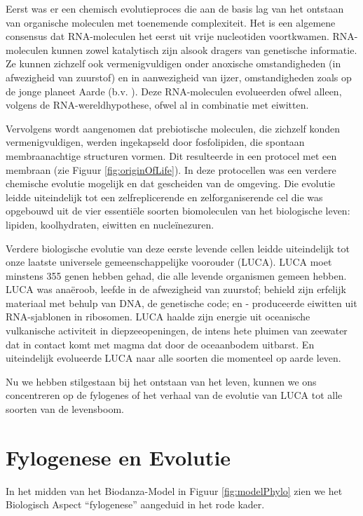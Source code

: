 \documentclass[
  11pt,
]{book}
\begin{document}
Eerst was er een chemisch evolutieproces die aan de basis lag van het ontstaan van organische moleculen met toenemende complexiteit. Het is een algemene consensus dat RNA-moleculen het eerst uit vrije nucleotiden voortkwamen. RNA-moleculen kunnen zowel katalytisch zijn alsook dragers van genetische informatie. Ze kunnen zichzelf ook vermenigvuldigen onder anoxische omstandigheden (in afwezigheid van zuurstof) en in aanwezigheid van ijzer, omstandigheden zoals op de jonge planeet Aarde (b.v. \citet{Williams2013}). Deze RNA-moleculen evolueerden ofwel alleen, volgens de RNA-wereldhypothese, ofwel al in combinatie met eiwitten.

Vervolgens wordt aangenomen dat prebiotische moleculen, die zichzelf konden vermenigvuldigen, werden ingekapseld door fosfolipiden, die spontaan membraanachtige structuren vormen. Dit resulteerde in een protocel met een membraan (zie Figuur \ref{fig:originOfLife}).
In deze protocellen was een verdere chemische evolutie mogelijk en dat gescheiden van de omgeving. Die evolutie leidde uiteindelijk tot een zelfreplicerende en zelforganiserende cel die was opgebouwd uit de vier essentiële soorten biomoleculen van het biologische leven: lipiden, koolhydraten, eiwitten en nucleïnezuren.

Verdere biologische evolutie van deze eerste levende cellen leidde uiteindelijk tot onze laatste universele gemeenschappelijke voorouder (LUCA). LUCA moet minstens 355 genen hebben gehad, die alle levende organismen gemeen hebben. LUCA was anaëroob, leefde in de afwezigheid van zuurstof; behield zijn erfelijk materiaal met behulp van DNA, de genetische code; en - produceerde eiwitten uit RNA-sjablonen in ribosomen. LUCA haalde zijn energie uit oceanische vulkanische activiteit in diepzeeopeningen, de intens hete pluimen van zeewater dat in contact komt met magma dat door de oceaanbodem uitbarst. En uiteindelijk evolueerde LUCA naar alle soorten die momenteel op aarde leven.

Nu we hebben stilgestaan bij het ontstaan van het leven, kunnen we ons concentreren op de fylogenes of het verhaal van de evolutie van LUCA tot alle soorten van de levensboom.

\hypertarget{fylogenese-en-evolutie}{%
\chapter{Fylogenese en Evolutie}\label{fylogenese-en-evolutie}}

In het midden van het Biodanza-Model in Figuur \ref{fig:modelPhylo} zien we het Biologisch Aspect ``fylogenese'' aangeduid in het rode kader.
\end{document}

